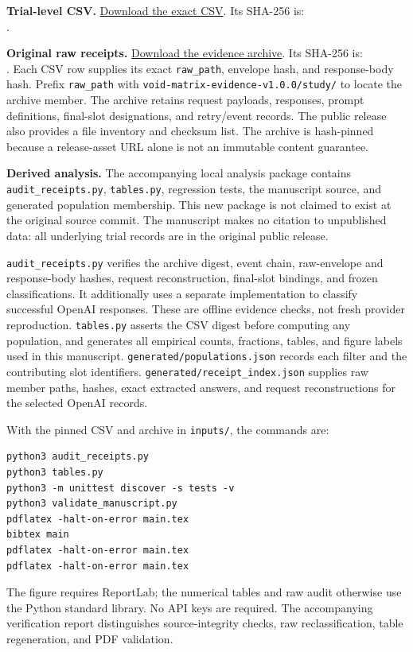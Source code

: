 \documentclass[11pt]{article}
\begin{document}
\textbf{Trial-level CSV.} \href{https://raw.githubusercontent.com/theonlypal/void-matrix-complete-analysis/3fd330869c1a4a410047bc70b3f661f1a9d69aca/analysis/tables/trial_level.csv}{Download the exact CSV}. Its SHA-256 is:\\
.

\textbf{Original raw receipts.} \href{https://github.com/theonlypal/void-matrix-complete-analysis/releases/download/v1.0.0-evidence-analysis/void-matrix-evidence-v1.0.0.zip}{Download the evidence archive}. Its SHA-256 is:\\
.
Each CSV row supplies its exact \texttt{raw\_path}, envelope hash, and response-body hash. Prefix \texttt{raw\_path} with \texttt{void-matrix-evidence-v1.0.0/study/} to locate the archive member. The archive retains request payloads, responses, prompt definitions, final-slot designations, and retry/event records. The public release also provides a file inventory and checksum list. The archive is hash-pinned because a release-asset URL alone is not an immutable content guarantee.

\textbf{Derived analysis.} The accompanying local analysis package contains \texttt{audit\_receipts.py}, \texttt{tables.py}, regression tests, the manuscript source, and generated population membership. This new package is not claimed to exist at the original source commit. The manuscript makes no citation to unpublished data: all underlying trial records are in the original public release.

\texttt{audit\_receipts.py} verifies the archive digest, event chain, raw-envelope and response-body hashes, request reconstruction, final-slot bindings, and frozen classifications. It additionally uses a separate implementation to classify successful OpenAI responses. These are offline evidence checks, not fresh provider reproduction. \texttt{tables.py} asserts the CSV digest before computing any population, and generates all empirical counts, fractions, tables, and figure labels used in this manuscript. \texttt{generated/populations.json} records each filter and the contributing slot identifiers. \texttt{generated/receipt\_index.json} supplies raw member paths, hashes, exact extracted answers, and request reconstructions for the selected OpenAI records.

With the pinned CSV and archive in \texttt{inputs/}, the commands are:
\begin{verbatim}
python3 audit_receipts.py
python3 tables.py
python3 -m unittest discover -s tests -v
python3 validate_manuscript.py
pdflatex -halt-on-error main.tex
bibtex main
pdflatex -halt-on-error main.tex
pdflatex -halt-on-error main.tex
\end{verbatim}
The figure requires ReportLab; the numerical tables and raw audit otherwise use the Python standard library. No API keys are required. The accompanying verification report distinguishes source-integrity checks, raw reclassification, table regeneration, and PDF validation.
\end{document}

